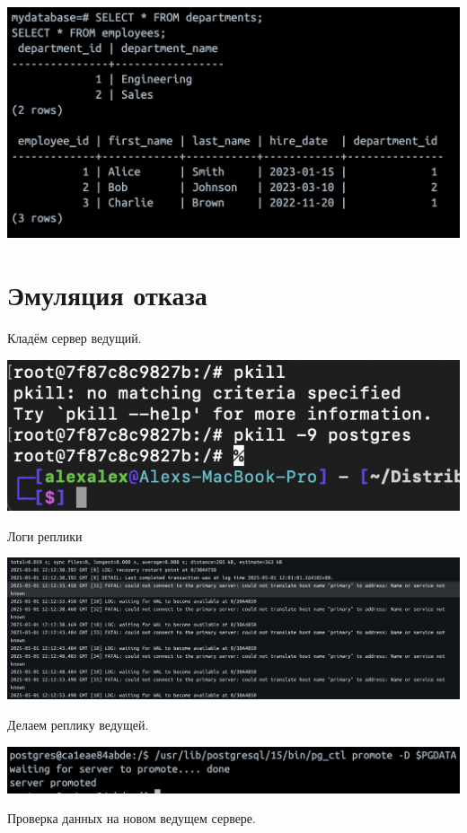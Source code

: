 \documentclass{article}
\begin{document}
\begin{center}
    \includegraphics[width=.9\textwidth]{checkprimary.png}
\end{center}

\section*{Эмуляция отказа}
Кладём сервер ведущий.
\begin{center}
    \includegraphics[width=.9\textwidth]{kill.png}
\end{center}
Логи реплики 
\begin{center}
    \includegraphics[width=.9\textwidth]{replica-after-kill.png}
\end{center}
Делаем реплику ведущей.
\begin{center}
    \includegraphics[width=.9\textwidth]{promote.png}
\end{center}
Проверка данных на новом ведущем сервере.
\end{document}

